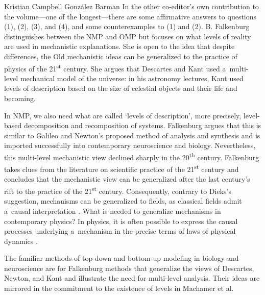 \begin{recengenv}{Kristian Campbell González Barman}
In the other co-editor's own contribution to the volume---one of the longest---there are some affirmative answers to questions (1), (2), (3), and (4), and some counterexamples to (1) and (2). B. Falkenburg distinguishes between the NMP and OMP but focuses on what levels of reality are used in mechanistic explanations. She is open to the idea that despite differences, the Old mechanistic ideas can be generalized to the practice of physics of the 21\textsuperscript{st} century. She argues that Descartes and Kant used a~multi-level mechanical model of the universe: in his astronomy lectures, Kant used levels of description based on the size of celestial objects and their life and becoming.

In NMP, we also need what are called ‘levels of description', more precisely, level-based decomposition and recomposition of systems. Falkenburg argues that this is similar to Galileo and Newton's proposed method of analysis and synthesis and is imported successfully into contemporary neuroscience and biology. Nevertheless, this multi-level mechanistic view declined sharply in the 20\textsuperscript{th} century. Falkenburg takes clues from the literature on scientific practice of the 21\textsuperscript{st} century and concludes that the mechanistic view can be generalized after the last century's rift to the practice of the 21\textsuperscript{st} century. Consequently, contrary to Dieks's suggestion, mechanisms can be generalized to fields, as classical fields admit a~causal interpretation
\parencites[][p.239]{salmon_scientific_1984}[referred at:][p.72]{falkenburg_mechanistic_2019}. %
 What is needed to generalize mechanisms in contemporary physics? In physics, it is often possible to express the causal processes underlying a~mechanism in the precise terms of laws of physical dynamics 
\parencite*[][p.73]{falkenburg_mechanistic_2019}.%


The familiar methods of top-down and bottom-up modeling in biology and neuroscience are for Falkenburg methods that generalize the views of Descartes, Newton, and Kant and illustrate the need for multi-level analysis. Their ideas are mirrored in the commitment to the existence of levels in Machamer et al.


\end{recengenv}
